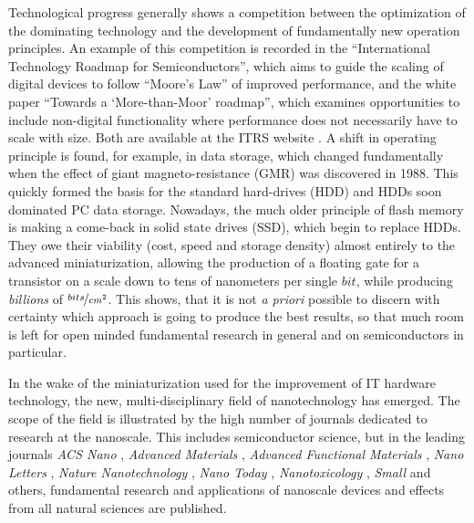



Technological progress generally shows a competition between the optimization of the dominating technology and the development of fundamentally new operation principles. An example of this competition is recorded in the ``International Technology Roadmap for Semiconductors'', which aims to guide the scaling of digital devices to follow ``Moore's Law'' of improved performance, and the white paper ``Towards a `More-than-Moor' roadmap'', which examines opportunities to include non-digital functionality where performance does not necessarily have to scale with size. Both are available at the ITRS website  \cite{map_http://www.itrs.net/_2015}. A shift in operating principle is found, for example, in data storage, which changed fundamentally when the effect of giant magneto-resistance (GMR) was discovered in 1988. 
This quickly formed the basis for the standard hard-drives (HDD) and HDDs soon dominated PC data storage. Nowadays, the much older principle of flash memory is making a come-back in solid state drives (SSD), which begin to replace HDDs. They owe their viability (cost, speed and storage density) almost entirely to the advanced miniaturization, allowing the production of a floating gate for a transistor on a scale down to tens of nanometers per single $bit$, while producing \emph{billions} of $\nicefrac{bits}{cm^{2}}$. This shows, that it is not \emph{a priori} possible to discern with certainty which approach is going to produce the best results, so that much room is left for open minded fundamental research in general and on semiconductors in particular.

In the wake of the miniaturization used for the improvement of IT hardware technology, the new, multi-disciplinary field of nanotechnology has emerged. The scope of the field is illustrated by the high number of journals dedicated to research at the nanoscale. This includes semiconductor science, but in the leading journals \emph{ACS Nano} \cite{acs_nano_http://pubs.acs.org/journal/ancac3_2015}, \emph{Advanced Materials} \cite{advanced_materials_http://www.advmat./_2015}, \emph{Advanced Functional Materials} \cite{advanced_functional_materials_http://onlinelibrary.wiley.com/journal/10.1002/issn1616-3028_2015}, \emph{Nano Letters} \cite{nano_letters_http://pubs.acs.org/journal/nalefd_2015}, \emph{Nature Nanotechnology} \cite{nature_nanotechnology_http://www.nature.com/nnano_2015}, \emph{Nano Today} \cite{nano_today_http://journals.elsevier.com/17480132/nano-today/_2015}, \emph{Nanotoxicology} \cite{nanotoxicology_http://www.informahealthcare.com/nan_2015}, \emph{Small} \cite{small_http://www.small-journal.com/_2015} and others, fundamental research and applications of nanoscale devices and effects from all natural sciences are published.

